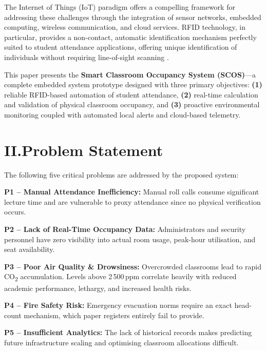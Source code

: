 \documentclass[12pt,a4paper]{article}
\begin{document}
The Internet of Things (IoT) paradigm offers a compelling framework for addressing
these challenges through the integration of sensor networks, embedded computing,
wireless communication, and cloud services. RFID technology, in particular, provides a
non-contact, automatic identification mechanism perfectly suited to student attendance
applications, offering unique identification of individuals without requiring line-of-sight
scanning \cite{finkenzeller2010}.

This paper presents the \textbf{Smart Classroom Occupancy System (SCOS)}---a complete
embedded system prototype designed with three primary objectives: \textbf{(1)} reliable
RFID-based automation of student attendance, \textbf{(2)} real-time calculation and validation of
physical classroom occupancy, and \textbf{(3)} proactive environmental monitoring coupled with
automated local alerts and cloud-based telemetry.

\section*{II.\quad Problem Statement}

The following five critical problems are addressed by the proposed system:

\textbf{P1 -- Manual Attendance Inefficiency:} Manual roll calls consume significant lecture
time and are vulnerable to proxy attendance since no physical verification occurs.

\textbf{P2 -- Lack of Real-Time Occupancy Data:} Administrators and security personnel have
zero visibility into actual room usage, peak-hour utilisation, and seat availability.

\textbf{P3 -- Poor Air Quality \& Drowsiness:} Overcrowded classrooms lead to rapid CO\textsubscript{2}
accumulation. Levels above 2\,500\,ppm correlate heavily with reduced academic
performance, lethargy, and increased health risks.

\textbf{P4 -- Fire Safety Risk:} Emergency evacuation norms require an exact head-count
mechanism, which paper registers entirely fail to provide.

\textbf{P5 -- Insufficient Analytics:} The lack of historical records makes predicting future
infrastructure scaling and optimising classroom allocations difficult.
\end{document}
